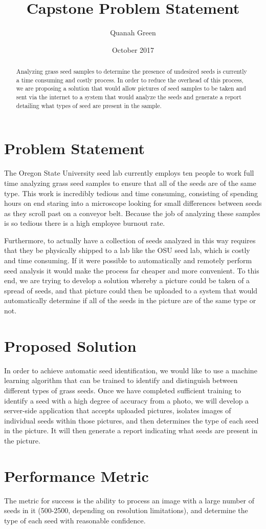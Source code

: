 \documentclass[10pt, titlepage]{article}
\title{Capstone Problem Statement}
\author{Quanah Green}
\date{October 2017}
\begin{document}
\maketitle

\begin{abstract}
Analyzing grass seed samples to determine the presence of undesired seeds is currently a time consuming and costly process. In order to reduce the overhead of this process, we are proposing a solution that would allow pictures of seed samples to be taken and sent via the internet to a system that would analyze the seeds and generate a report detailing what types of seed are present in the sample.
\end{abstract}

\section{Problem Statement}
The Oregon State University seed lab currently employs ten people to work full time analyzing grass seed samples to ensure that all of the seeds are of the same type. This work is incredibly tedious and time consuming, consisting of spending hours on end staring into a microscope looking for small differences between seeds as they scroll past on a conveyor belt. Because the job of analyzing these samples is so tedious there is a high employee burnout rate. 

Furthermore, to actually have a collection of seeds analyzed in this way requires that they be physically shipped to a lab like the OSU seed lab, which is costly and time consuming. If it were possible to automatically and remotely perform seed analysis it would make the process far cheaper and more convenient. To this end, we are trying to develop a solution whereby a picture could be taken of a spread of seeds, and that picture could then be uploaded to a system that would automatically determine if all of the seeds in the picture are of the same type or not.


\section{Proposed Solution}
In order to achieve automatic seed identification, we would like to use a machine learning algorithm that can be trained to identify and distinguish between different types of grass seeds. Once we have completed sufficient training to identify a seed with a high degree of accuracy from a photo, we will develop a server-side application that accepts uploaded pictures, isolates images of individual seeds within those pictures, and then determines the type of each seed in the picture. It will then generate a report indicating what seeds are present in the picture.


\section{Performance Metric}
The metric for success is the ability to process an image with a large number of seeds in it (500-2500, depending on resolution limitations), and determine the type of each seed with reasonable confidence. 
\end{document}

